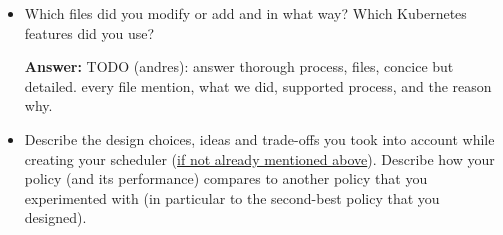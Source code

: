 \begin{enumerate}
\begin{enumerate}
\begin{itemize}
\begin{itemize}
            \item {}: 2 threads, as it only showed a limited speedup in Part 2 when increasing the number of threads, and it takes a similar time to finish when being run on 2 threads as blackscholes being run on 1 thread.
            
            \item {}: 8 threads, as it showed significant speedup in Part 2 when running it on 8 threads.
            
            \item {}: 8 threads, as it showed significant, almost linear speedup in Part 2 when running it on 8 threads, and as this is a SPLASH-job, the number of threads should be a power of 2.
           
            \item {}: 8 threads, as it showed significant speedup in Part 2 when running it on 8 threads.
            
            \item {}: 3 threads, as it showed limited but slightly better speedup when increasing the number of threads, is the last task to be executed and therefore can receive the remaining threads, and finishes in a similar time as the tasks on on node-a-8core.
            \\
        \end{itemize}

        \item Which files did you modify or add and in what way? Which Kubernetes features did you use?
    
        \textbf{Answer:} %
        TODO (andres): answer thorough process, files, concice but detailed.
        every file mention, what we did, supported process, and the reason why.
        \\ 
        
    
        \item Describe the design choices, ideas and trade-offs you took into account while creating your scheduler (\underline{if not already mentioned above}). Describe how your policy (and its performance) compares to another policy that you experimented with (in particular to the second-best policy that you designed).


\end{itemize}
\end{enumerate}
\end{enumerate}
